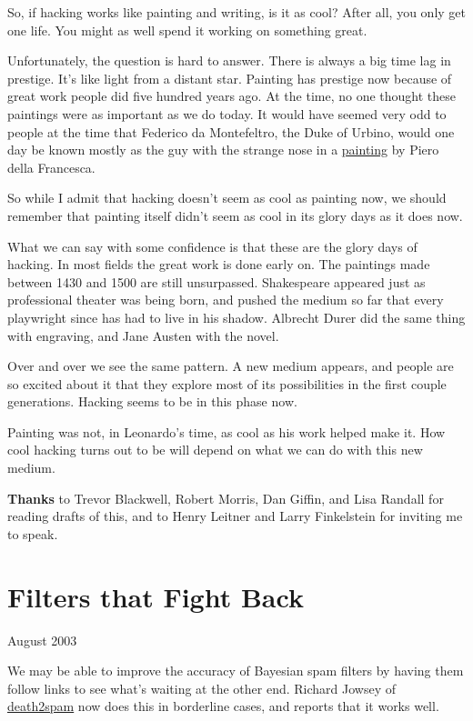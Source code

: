 \documentclass[12pt]{book}
\begin{document}
So, if hacking works like painting and writing, is it as cool? After
all, you only get one life. You might as well spend it working on
something great.

Unfortunately, the question is hard to answer. There is always a big
time lag in prestige. It's like light from a distant star. Painting has
prestige now because of great work people did five hundred years ago. At
the time, no one thought these paintings were as important as we do
today. It would have seemed very odd to people at the time that Federico
da Montefeltro, the Duke of Urbino, would one day be known mostly as the
guy with the strange nose in a \href{montefeltro.html}{painting} by
Piero della Francesca.

So while I admit that hacking doesn't seem as cool as painting now, we
should remember that painting itself didn't seem as cool in its glory
days as it does now.

What we can say with some confidence is that these are the glory days of
hacking. In most fields the great work is done early on. The paintings
made between 1430 and 1500 are still unsurpassed. Shakespeare appeared
just as professional theater was being born, and pushed the medium so
far that every playwright since has had to live in his shadow. Albrecht
Durer did the same thing with engraving, and Jane Austen with the novel.

Over and over we see the same pattern. A new medium appears, and people
are so excited about it that they explore most of its possibilities in
the first couple generations. Hacking seems to be in this phase now.

Painting was not, in Leonardo's time, as cool as his work helped make
it. How cool hacking turns out to be will depend on what we can do with
this new medium.


\textbf{Thanks} to Trevor Blackwell, Robert Morris, Dan Giffin, and Lisa
Randall for reading drafts of this, and to Henry Leitner and Larry
Finkelstein for inviting me to speak.
\chapter{Filters that Fight Back}

August 2003

We may be able to improve the accuracy of Bayesian spam filters by
having them follow links to see what's waiting at the other end. Richard
Jowsey of \href{http://death2spam.com}{death2spam} now does this in
borderline cases, and reports that it works well.
\end{document}
